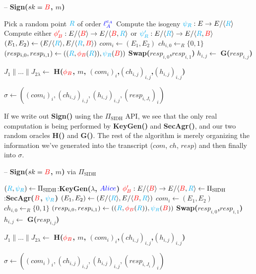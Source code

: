 \begin{algorithm}
\caption{-- \textbf{Sign($sk = \textcolor{red}{B}$, $m$)}}\label{euclid}
\begin{algorithmic}[1]
	\State Pick a random point $\textcolor{cyan}{R}$ of order $\textcolor{blue}{\ell_{A}^{e_A}}$
	\State Compute the isogeny $\textcolor{cyan}{\psi_R}: E \rightarrow E/\langle \textcolor{cyan}{R} \rangle$
	\State Compute either $\textcolor{red}{\phi'_B} : E/\langle \textcolor{red}{B} \rangle \rightarrow E/\langle \textcolor{red}{B},\textcolor{cyan}{R} \rangle$ or $\textcolor{cyan}{\psi'_R} : E/\langle \textcolor{cyan}{R} \rangle \rightarrow E/\langle \textcolor{cyan}{R},\textcolor{red}{B} \rangle$
	\State $(E_{1},E_{2}) \gets (E/\langle \textcolor{cyan}{R} \rangle, E/\langle \textcolor{cyan}{R},\textcolor{red}{B} \rangle)$
	\State $com_{i} \gets (E_{1}, E_{2})$
	\State $ch_{i,0} \gets_{R} \{0,1\}$
	\State $(resp_{i,0}, resp_{i,1}) \gets ((\textcolor{cyan}{R},\textcolor{red}{\phi_B}(\textcolor{cyan}{R})), \textcolor{cyan}{\psi_R}(\textcolor{red}{B}))$
		\State \textbf{Swap($resp_{i,0}$,$resp_{i,1}$)}
	\EndIf
	\State $h_{i,j} \gets$ \textbf{G($resp_{i,j}$)}
\EndFor

\State $J_{1} \parallel ... \parallel J_{2\lambda} \gets$ \textbf{H($\textcolor{red}{\phi_B}$, $m$, $(com_{i})_{i}$,$(ch_{i,j})_{i,j}$,$(h_{i,j})_{i,j}$)}

\State \Return $\sigma \gets ((com_{i})_{i}, (ch_{i,j})_{i,j}, (h_{i,j})_{i,j}, (resp_{i,J_{i}})_{i})$
\end{algorithmic}
\end{algorithm}

\noindent
If we write out \textbf{Sign()} using the $\Pi_{\text{SIDH}}$ API, we see that the only real computation is being performed by \textbf{KeyGen()} and \textbf{SecAgr()}, and our two random oracles \textbf{H()} and \textbf{G()}.  The rest of the algorithm is merely organizing the information we've generated into the transcript ($com$, $ch$, $resp$) and then finally into $\sigma$.

\begin{algorithm}
\caption{-- \textbf{Sign($sk = \textcolor{red}{B}$, $m$)} via $\Pi_{\text{SIDH}}$}\label{euclid}
\begin{algorithmic}[1]
	\State $(\textcolor{cyan}{R},\textcolor{cyan}{\psi_R}) \gets \Pi_{\text{SIDH}}$:\textbf{KeyGen($\lambda$, $\textcolor{blue}{Alice}$)}
	\State $\textcolor{red}{\phi'_B}: E/\langle \textcolor{red}{B} \rangle \rightarrow E/\langle \textcolor{red}{B},\textcolor{cyan}{R} \rangle \gets \Pi_{\text{SIDH}}$:\textbf{SecAgr($\textcolor{red}{B}$, $\textcolor{cyan}{\psi_R}$)}
	\State $(E_{1},E_{2}) \gets (E/\langle \textcolor{cyan}{R} \rangle, E/\langle \textcolor{red}{B},\textcolor{cyan}{R} \rangle)$
	\State $com_{i} \gets (E_{1}, E_{2})$
	\State $ch_{i,0} \gets_{R} \{0,1\}$
	\State $(resp_{i,0}, resp_{i,1}) \gets ((\textcolor{cyan}{R},\textcolor{red}{\phi_B}(\textcolor{cyan}{R})), \textcolor{cyan}{\psi_R}(\textcolor{red}{B}))$
		\State \textbf{Swap($resp_{i,0}$,$resp_{i,1}$)}
	\EndIf
	\State $h_{i,j} \gets$ \textbf{G($resp_{i,j}$)}
\EndFor

\State $J_{1} \parallel ... \parallel J_{2\lambda} \gets$ \textbf{H($\textcolor{red}{\phi_B}$, $m$, $(com_{i})_{i}$,$(ch_{i,j})_{i,j}$,$(h_{i,j})_{i,j}$)}

\State \Return $\sigma \gets ((com_{i})_{i}, (ch_{i,j})_{i,j}, (h_{i,j})_{i,j}, (resp_{i,J_{i}})_{i})$
\end{algorithmic}
\end{algorithm}


